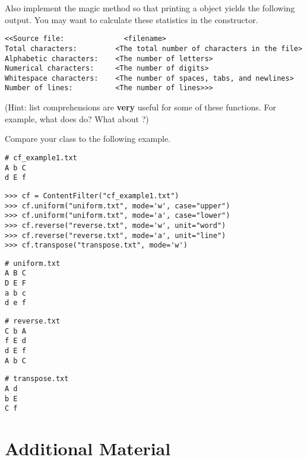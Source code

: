 \begin{problem}
Also implement the  magic method so that printing a  object yields the following output.
You may want to calculate these statistics in the constructor.
\begin{lstlisting}
<<Source file:              <filename>
Total characters:         <The total number of characters in the file>
Alphabetic characters:    <The number of letters>
Numerical characters:     <The number of digits>
Whitespace characters:    <The number of spaces, tabs, and newlines>
Number of lines:          <The number of lines>>>
\end{lstlisting}
(Hint: list comprehensions are \textbf{very} useful for some of these functions.
For example, what does  do?
What about ?)

Compare your class to the following example.

\begin{lstlisting}
# cf_example1.txt
A b C
d E f
\end{lstlisting}

\begin{lstlisting}
>>> cf = ContentFilter("cf_example1.txt")
>>> cf.uniform("uniform.txt", mode='w', case="upper")
>>> cf.uniform("uniform.txt", mode='a', case="lower")
>>> cf.reverse("reverse.txt", mode='w', unit="word")
>>> cf.reverse("reverse.txt", mode='a', unit="line")
>>> cf.transpose("transpose.txt", mode='w')
\end{lstlisting}

\begin{lstlisting}
# uniform.txt
A B C
D E F
a b c
d e f
\end{lstlisting}

\begin{lstlisting}
# reverse.txt
C b A
f E d
d E f
A b C
\end{lstlisting}

\begin{lstlisting}
# transpose.txt
A d
b E
C f
\end{lstlisting}
\end{problem}

\newpage

\section*{Additional Material} %

